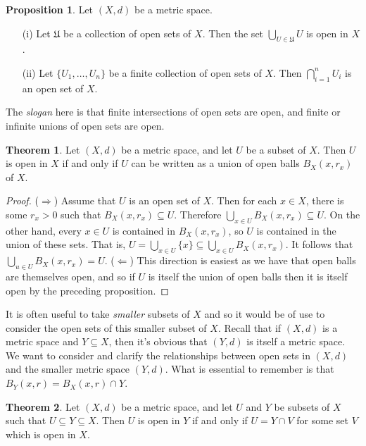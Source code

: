 \documentclass[9pt,reqno]{amsart}
\theoremstyle{definition}
\newtheorem{theorem}{Theorem}[section]
\newtheorem{prop}{Proposition}[section]
\begin{document}
\begin{prop}
Let $(X,d)$ be a metric space.
\begin{itemize}
	\item [(i)] Let $\mathfrak U$ be a collection of open sets of $X$. Then the set $\bigcup _{U \in \mathfrak U} U$ is open in $X$.
	\item [(ii)] Let $\{U_1, \ldots, U_n \}$ be a finite collection of open sets of $X$. Then $\bigcap _{i=1}^n U_i$ is an open set of $X$.
\end{itemize}
The \textit{slogan} here is that finite intersections of open sets are open, and finite or infinite unions of open sets are open.	
\end{prop}
\begin{theorem}
	Let $(X,d)$ be a metric space, and let $U$ be a subset of $X$. Then $U$ is open in $X$ if and only if $U$ can be written as a union of open balls $B_X(x,r_x)$ of $X$.
\end{theorem}
\begin{proof}($\Rightarrow$) Assume that $U$ is an open set of $X$. Then for each $x \in X$, there is some $r_x > 0$ such that $B_X(x, r_x) \subseteq U$. Therefore $\bigcup _{x \in U} B_X(x, r_x) \subseteq U$. On the other hand, every $x \in U$ is contained in $B_X(x,r_x)$, so $U$ is contained in the union of these sets. That is, $U = \bigcup _{x \in U} \{x \} \subseteq \bigcup _{x \in U} B_X(x,r_x)$. It follows that $\bigcup _{u \in U} B_X(x, r_x) = U$. ($\Leftarrow$) This direction is easiest as we have that open balls are themselves open, and so if $U$ is itself the union of open balls then it is itself open by the preceding proposition. 
\end{proof}
It is often useful to take \textit{smaller} subsets of $X$ and so it would be of use to consider the open sets of this smaller subset of $X$. Recall that if $(X,d)$ is a metric space and $Y \subseteq X$, then it's obvious that $(Y,d)$ is itself a metric space. We want to consider and clarify the relationships between open sets in $(X,d)$ and the smaller metric space $(Y,d)$. What is essential to remember is that $B_Y(x,r) = B_X(x,r) \cap Y$.
\begin{theorem}
	Let $(X,d)$ be a metric space, and let $U$ and $Y$ be subsets of $X$ such that $U \subseteq Y \subseteq X$. Then $U$ is open in $Y$ if and only if $U = Y \cap V$ for some set $V$ which is open in $X$. 
\end{theorem}
\end{document}
